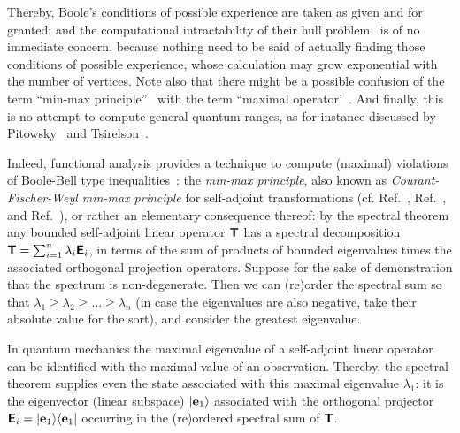 Thereby, Boole's conditions of possible
experience are taken as given and for granted; and the computational intractability of their hull problem~\cite{Pit-91}
is of no immediate concern, because nothing need to be said of actually finding  those conditions of possible experience, whose
calculation may grow exponential with the number of vertices.
Note also that there might be a possible confusion of the term ``min-max principle''~\cite[\S~90]{halmos-vs} with
the term ``maximal operator'~\cite[\S~84]{halmos-vs}.
And finally, this is no attempt to compute general quantum ranges,
as for instance discussed by Pitowsky~\cite{pitowsky-86,pit:range-2001,Pitowsky-08-ge}
and Tsirelson~\cite{cirelson:80,cirelson:87,cirelson}.

Indeed, functional analysis provides a technique to compute (maximal) violations of Boole-Bell type inequalities~\cite{filipp-svo-04-qpoly,filipp-svo-05}:
the
{\em min-max principle},
also known as
{\em Courant-Fischer-Weyl min-max principle} for self-adjoint transformations
(cf. Ref.~\cite[\S~90]{halmos-vs},  Ref.~\cite[pp.~75ff]{reed-sim4},
and  Ref.~\cite[Sect.~4.4, pp.~142ff]{Teschl-schr}),
or rather an elementary consequence thereof:
by the spectral theorem any bounded self-adjoint linear operator $\textsf{\textbf{T}}$ has a spectral decomposition
$\textsf{\textbf{T}}=\sum_{i=1}^{n} \lambda_i \textsf{\textbf{E}}_i$, in terms of the sum of products
of bounded eigenvalues times the associated orthogonal projection operators.
Suppose for the sake of demonstration that the spectrum is non-degenerate.
Then we can (re)order the spectral sum so that $\lambda_1 \ge \lambda_2 \ge \ldots \ge \lambda_n$
(in case the eigenvalues are also negative, take their absolute value for the sort),
and consider  the greatest eigenvalue.%

In quantum mechanics  the maximal eigenvalue of a self-adjoint linear operator can be identified
with the maximal value of an observation.
Thereby, the spectral theorem supplies even the state associated with this maximal eigenvalue $\lambda_1$: it is the
eigenvector (linear subspace)  $\vert {\bf e}_1 \rangle $ associated with the orthogonal projector
 $\textsf{\textbf{E}}_i = \vert {\bf e}_1 \rangle \langle  {\bf e}_1 \vert $ occurring in the (re)ordered
spectral sum  of $\textsf{\textbf{T}}$.

